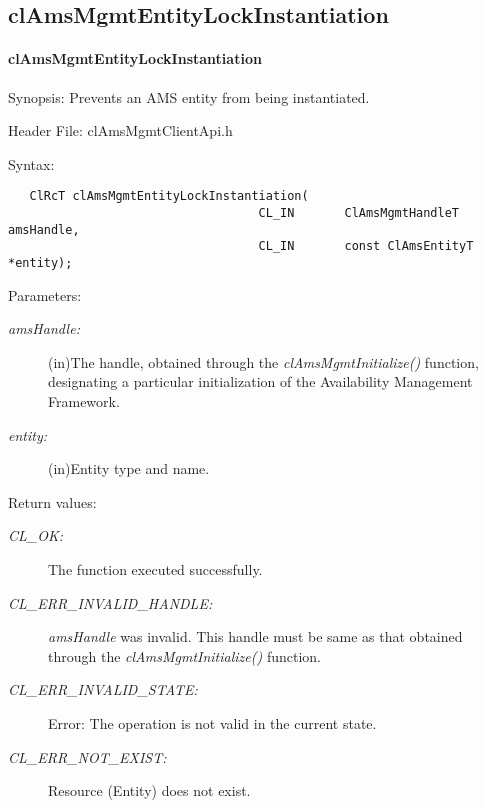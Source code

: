 \subsection{clAmsMgmtEntityLockInstantiation}
\hypertarget{pageams111}{}\paragraph{cl\-Ams\-Mgmt\-Entity\-Lock\-Instantiation}\label{pageams111}
\begin{Desc}
\item[Synopsis:]Prevents an AMS entity from being instantiated.\end{Desc}
\begin{Desc}
\item[Header File:]clAmsMgmtClientApi.h\end{Desc}
\begin{Desc}
\item[Syntax:]

\footnotesize\begin{verbatim}   ClRcT clAmsMgmtEntityLockInstantiation(
	                               CL_IN       ClAmsMgmtHandleT            amsHandle,
	                               CL_IN       const ClAmsEntityT          *entity);
\end{verbatim}
\normalsize
\end{Desc}
\begin{Desc}
\item[Parameters:]
\begin{description}
\item[{\em ams\-Handle:}](in)The handle, obtained through the \textit{clAmsMgmtInitialize()} function, designating a particular initialization of the
Availability Management Framework. \item[{\em entity:}](in)Entity type and name.\end{description}
\end{Desc}
\begin{Desc}
\item[Return values:]
\begin{description}
\item[{\em CL\_\-OK:}]The function executed successfully. \item[{\em CL\_\-ERR\_\-INVALID\_\-HANDLE:}]{\em ams\-Handle\/} was invalid. 
This handle must be same as that obtained through the \textit{clAmsMgmtInitialize()} function. \item[{\em CL\_\-ERR\_\-INVALID\_\-STATE:}]Error: The operation is not valid in the current state. \item[{\em CL\_\-ERR\_\-NOT\_\-EXIST:}]Resource (Entity) does not exist.\end{description}
\end{Desc}
